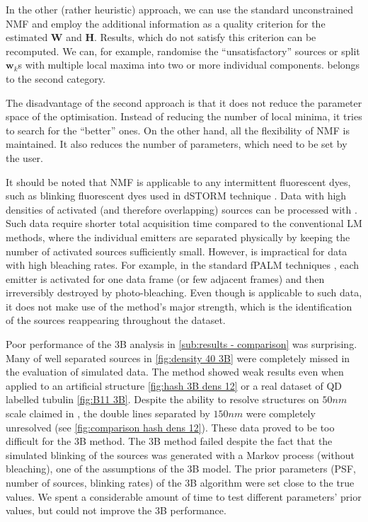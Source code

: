 In the other (rather heuristic) approach, we can use the standard unconstrained NMF and employ the additional information as a quality criterion for the estimated $\bm{W}$ and $\bm{H}$. Results, which do not satisfy this criterion can be recomputed. We can, for example, randomise the ``unsatisfactory'' sources or split $\bm{w}_k$s with multiple local maxima into two or more individual components. \inmf{} belongs to the second category.

The disadvantage of the second approach is that it does not reduce the parameter space of the optimisation. Instead of reducing the number of local minima, it tries to search for the ``better'' ones. On the other hand, all the flexibility of NMF is maintained. It also reduces the number of parameters, which need to be set by the user.

It should be noted that NMF is applicable to any intermittent fluorescent dyes, such as blinking fluorescent dyes used in dSTORM technique \cite{VandeLinde2011}. Data with high densities of activated (and therefore overlapping) sources can be processed with \inmf{}. Such data require shorter total acquisition time compared to the conventional LM methods, where the individual emitters are separated physically by keeping the number of activated sources sufficiently small. However, \inmf{} is impractical for data with high bleaching rates. For example, in the standard fPALM techniques \cite{Hess2006}, each emitter is activated for one data frame (or few adjacent frames) and then irreversibly destroyed by photo-bleaching.  Even though \inmf{} is applicable to such data, it does not make use of the method's major strength, which is the identification of the sources reappearing throughout the dataset.  
 
Poor performance of the 3B analysis in \autoref{sub:results - comparison} was surprising. Many of well separated sources in \autoref{fig:density 40 3B} were completely missed in the evaluation of simulated data. The method showed weak results even when applied to an artificial structure \autoref{fig:hash 3B  dens 12} or a real dataset of QD labelled tubulin \autoref{fig:B11 3B}. Despite the ability to resolve structures on $50 \unit{nm}$ scale claimed in \cite{Cox2011}, the double lines separated by $150 \unit{nm}$ were completely unresolved (see \autoref{fig:comparison hash dens 12}). These data proved to be too difficult for the 3B method. The 3B method failed despite the fact that the simulated blinking of the sources was generated with a Markov process (without bleaching), one of the assumptions of the 3B model. The prior parameters (PSF, number of sources, blinking rates) of the 3B algorithm were set close to the true values. We spent a considerable amount of time to test different parameters' prior values, but could not improve the 3B performance.

